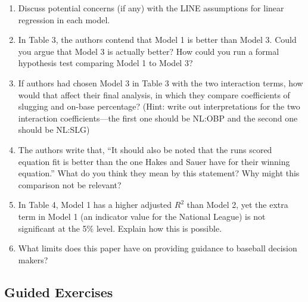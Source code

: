 \documentclass[
]{krantz}
\providecommand{\tightlist}{%
  \setlength{\itemsep}{0pt}\setlength{\parskip}{0pt}}
\begin{document}
\begin{enumerate}
  \begin{enumerate}
  \def\labelenumii{\alph{enumii}.}
  \tightlist
  \item
    Discuss potential concerns (if any) with the LINE assumptions for linear regression in each model.
  \item
    In Table 3, the authors contend that Model 1 is better than Model 3. Could you argue that Model 3 is actually better? How could you run a formal hypothesis test comparing Model 1 to Model 3?
  \item
    If authors had chosen Model 3 in Table 3 with the two interaction terms, how would that affect their final analysis, in which they compare coefficients of slugging and on-base percentage? (Hint: write out interpretations for the two interaction coefficients---the first one should be NL:OBP and the second one should be NL:SLG)
  \item
    The authors write that, ``It should also be noted that the runs scored equation fit is better than the one Hakes and Sauer have for their winning equation.'' What do you think they mean by this statement? Why might this comparison not be relevant?
  \item
    In Table 4, Model 1 has a higher adjusted \(R^2\) than Model 2, yet the extra term in Model 1 (an indicator value for the National League) is not significant at the 5\% level. Explain how this is possible.
  \item
    What limits does this paper have on providing guidance to baseball decision makers?
  \end{enumerate}
\end{enumerate}

\subsection{Guided Exercises}\label{guided-exercises}
\end{document}
